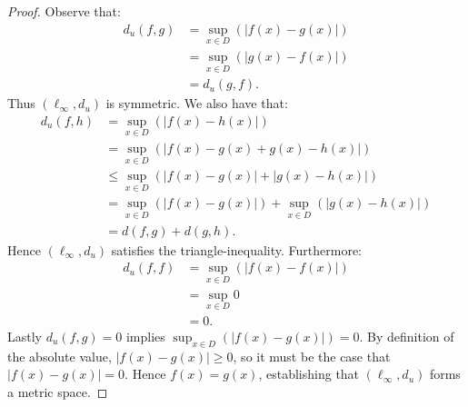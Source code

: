 \documentclass[10pt,twoside,openany]{memoir}
\begin{document}
        \begin{proof}
            Observe that:
                \begin{equation*}
                \begin{split}
                    d_u(f,g)
                    & = \sup_{x \in D}\left(\left|f(x) - g(x)\right|\right) \\
                    & = \sup_{x \in D}\left(\left|g(x) - f(x)\right|\right) \\
                    & = d_u(g,f).
                \end{split}
                \end{equation*}
            Thus $(\ell_\infty,d_u)$ is symmetric. We also have that:
                \begin{equation*}
                \begin{split}
                    d_u(f,h)
                    & = \sup_{x \in D}\left(\left|f(x) - h(x)\right|\right) \\
                    & = \sup_{x \in D}\left(\left|f(x) - g(x) + g(x) - h(x)\right|\right)\\
                    & \leq \sup_{x \in D}\left(\left|f(x)-g(x)\right| + \left|g(x) - h(x)\right|\right)\\
                    & = \sup_{x \in D}\left(\left|f(x)-g(x)\right|\right) + \sup_{x \in D}\left(\left|g(x)-h(x)\right|\right)\\
                    & = d(f,g) + d(g,h).
                \end{split}
                \end{equation*}
            Hence $(\ell_\infty,d_u)$ satisfies the triangle-inequality. Furthermore:
                \begin{equation*}
                \begin{split}
                    d_u(f,f)
                    & = \sup_{x \in D}\left(\left|f(x) - f(x)\right|\right) \\
                    & = \sup_{x \in D}0 \\
                    & = 0.
                \end{split}
                \end{equation*}
            Lastly $d_u(f,g)=0$ implies $\sup_{x \in D}\left(\left|f(x) - g(x)\right|\right) = 0$. By definition of the absolute value, $|f(x)-g(x)| \geq 0$, so it must be the case that $|f(x)-g(x)| = 0$. Hence $f(x) = g(x)$, establishing that $(\ell_\infty,d_u)$ forms a metric space.
        \end{proof}
\end{document}
